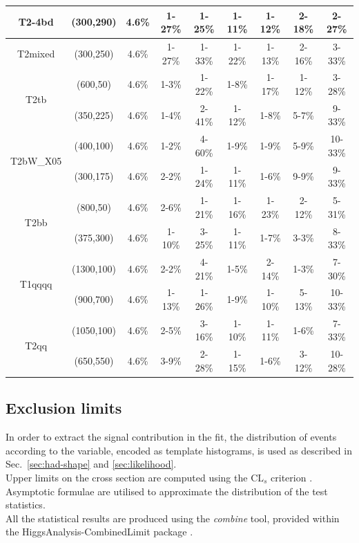 \begin{table}[h!]
\begin{tabular}{ ccccccccc }
\multirow{1}{*}{T2-4bd}
 & (300,290) & 4.6\% & 1-27\% & 1-25\% & 1-11\% & 1-12\% & 2-18\% & 2-27\% \\ \hline 
\multirow{1}{*}{T2mixed}
 & (300,250) & 4.6\% & 1-27\% & 1-33\% & 1-22\% & 1-13\% & 2-16\% & 3-33\% \\ \hline 
\multirow{2}{*}{T2tb}
 & (600,50) & 4.6\% & 1-3\% & 1-22\% & 1-8\% & 1-17\% & 1-12\% & 3-28\% \\ 
 & (350,225) & 4.6\% & 1-4\% & 2-41\% & 1-12\% & 1-8\% & 5-7\% & 9-33\% \\ \hline 
\multirow{2}{*}{T2bW\_X05}
 & (400,100) & 4.6\% & 1-2\% & 4-60\% & 1-9\% & 1-9\% & 5-9\% & 10-33\% \\ 
 & (300,175) & 4.6\% & 2-2\% & 1-24\% & 1-11\% & 1-6\% & 9-9\% & 9-33\% \\ \hline 
\multirow{2}{*}{T2bb}
 & (800,50) & 4.6\% & 2-6\% & 1-21\% & 1-16\% & 1-23\% & 2-12\% & 5-31\% \\ 
 & (375,300) & 4.6\% & 1-10\% & 3-25\% & 1-11\% & 1-7\% & 3-3\% & 8-33\% \\ \hline 
\multirow{2}{*}{T1qqqq}
 & (1300,100) & 4.6\% & 2-2\% & 4-21\% & 1-5\% & 2-14\% & 1-3\% & 7-30\% \\ 
 & (900,700) & 4.6\% & 1-13\% & 1-26\% & 1-9\% & 1-10\% & 5-13\% & 10-33\% \\ \hline 
\multirow{2}{*}{T2qq}
 & (1050,100) & 4.6\% & 2-5\% & 3-16\% & 1-10\% & 1-11\% & 1-6\% & 7-33\% \\ 
 & (650,550) & 4.6\% & 3-9\% & 2-28\% & 1-15\% & 1-6\% & 3-12\% & 10-28\% \\ \hline 
    \hline
  \end{tabular}
\end{table}






\subsection{Exclusion limits}
\label{sec:susy_results}

In order to extract the signal contribution in the fit, the distribution of events according to the \mht variable, 
encoded as template histograms, is used as described in Sec.~\ref{sec:had-shape} and \ref{sec:likelihood}. \\
Upper limits on the cross section are computed using the $\text{CL}_{s}$ criterion \cite{CLsTechnique}. 
Asymptotic formulae \cite{AsymptoticFormulae} are utilised to approximate the distribution of the test statistics. \\
All the statistical results are produced using the \textit{combine} tool, 
provided within the HiggsAnalysis-CombinedLimit package \cite{Combine}. 

